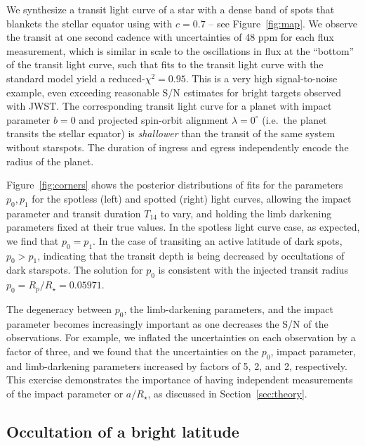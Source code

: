 We synthesize a transit light curve of a star with a dense band of spots that blankets the stellar equator using \stsp with $c=0.7$ -- see Figure~\ref{fig:map}. We observe the transit at one second cadence with uncertainties of 48 ppm for each flux measurement, which is similar in scale to the oscillations in flux at the ``bottom'' of the transit light curve, such that fits to the transit light curve with the standard \citep{Mandel2002} model yield a reduced-$\chi^2 = 0.95$. This is a very high signal-to-noise example, even exceeding reasonable S/N estimates for bright targets observed with JWST. The corresponding transit light curve for a planet with impact parameter $b=0$ and projected spin-orbit alignment $\lambda = 0^\circ$ (i.e.~the planet transits the stellar equator) is \textit{shallower} than the transit of the same system without starspots. The duration of ingress and egress independently encode the radius of the planet. 

Figure~\ref{fig:corners} shows the posterior distributions of fits for the parameters $p_0, p_1$ for the spotless (left) and spotted (right) light curves, allowing the impact parameter and transit duration $T_{14}$ to vary, and holding the limb darkening parameters fixed at their true values. In the spotless light curve case, as expected, we find that $p_0 = p_1$. In the case of transiting an active latitude of dark spots, $p_0 > p_1$, indicating that the transit depth is  being decreased by occultations of dark starspots. The solution for $p_0$ is consistent with the injected transit radius $p_0=R_p/R_\star = 0.05971$. 

The degeneracy between $p_0$, the limb-darkening parameters, and the impact parameter becomes increasingly important as one decreases the S/N of the observations. For example, we inflated the uncertainties on each observation by a factor of three, and we found that the uncertainties on the $p_0$, impact parameter, and limb-darkening parameters increased by factors of 5, 2, and 2, respectively. This exercise demonstrates the importance of having independent measurements of the impact parameter or $a/R_\star$, as discussed in Section~\ref{sec:theory}.

\subsection{Occultation of a bright latitude} \label{sec:brightlat}

